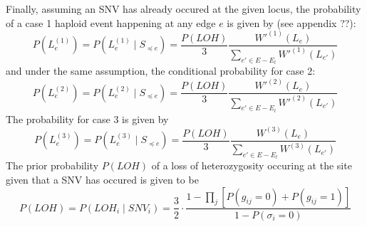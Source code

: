 \documentclass[../../main.tex]{subfiles}
\begin{document}
Finally, assuming an SNV has already occured at the given locus, the probability of a case 1 haploid event happening at any edge $e$ is given by (see appendix ??):
\begin{equation*}
P(L_e^{(1)}) = P(L_e^{(1)}\mid S_{\preceq e}) = \frac{P(LOH)}{3} \frac{W'^{(1)}(L_e)}{\sum_{e'\in E-E_l}W'^{(1)}(L_{e'})}
\end{equation*}
and under the same assumption, the conditional probability for case 2:
\begin{equation*}
P(L_e^{(2)}) = P(L_e^{(2)}\mid S_{\preceq e}) = \frac{P(LOH)}{3} \frac{W'^{(2)}(L_e)}{\sum_{e'\in E-E_l}W'^{(2)}(L_{e'})}
\end{equation*}
The probability for case 3 is given by
\begin{equation*}
P(L_e^{(3)}) = P(L_e^{(3)}\mid S_{\preceq e}) = \frac{P(LOH)}{3} \frac{W^{(3)}(L_e)}{\sum_{e'\in E-E_l}W^{(3)}(L_{e'})}
\end{equation*}
The prior probability $P(LOH)$ of a loss of heterozygosity occuring at the site given that a SNV has occured is given to be
\begin{equation*}
P(LOH) = P(LOH_i \mid SNV_i) = \frac{3}{2}\cdot\frac{1-\prod_j\left[P(g_{ij}=0)+P(g_{ij}=1)\right]}{1-P(\sigma_i = 0)}
\end{equation*}
\end{document}
